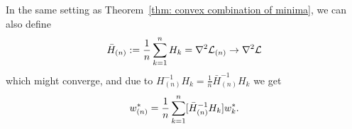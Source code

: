 \begin{corollary}
	In the same setting as Theorem~\ref{thm: convex combination of minima}, we
	can also define
	\begin{align*}
		\bar{H}_{(n)} := \frac1n\sum_{k=1}^n H_k = \nabla^2\mathcal{L}_{(n)} \to \nabla^2\mathcal{L}
	\end{align*}
	which might converge, and due to \(H_{(n)}^{-1}H_k = \tfrac1n\bar{H}_{(n)}^{-1}H_k\)
	we get
	\begin{align*}
		w^*_{(n)}
		= \frac1n\sum_{k=1}^n [\bar{H}_{(n)}^{-1} H_k] w^*_{k}.
	\end{align*}
\end{corollary}

